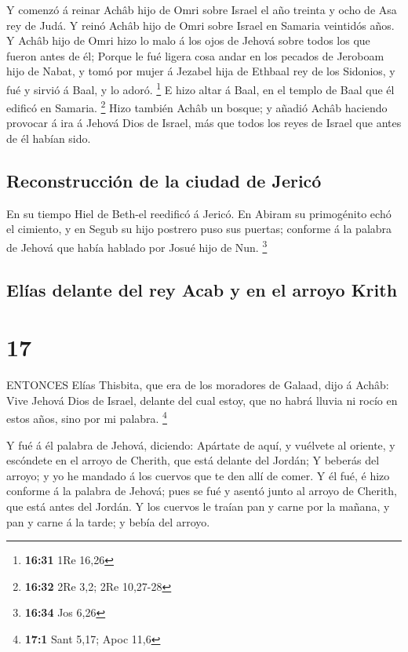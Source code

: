  Y comenzó á reinar Achâb hijo de Omri sobre Israel el año
treinta y ocho de Asa rey de Judá.  Y reinó Achâb hijo de
Omri sobre Israel en Samaria veintidós años. Y Achâb hijo de Omri hizo
lo malo á los ojos de Jehová sobre todos los que fueron antes de él;
 Porque le fué ligera cosa andar en los pecados de Jeroboam
hijo de Nabat, y tomó por mujer á Jezabel hija de Ethbaal rey de los
Sidonios, y fué y sirvió á Baal, y lo adoró. \footnote{\textbf{16:31}
  1Re 16,26}  E hizo altar á Baal, en el templo de Baal que
él edificó en Samaria. \footnote{\textbf{16:32} 2Re 3,2; 2Re 10,27-28}
 Hizo también Achâb un bosque; y añadió Achâb haciendo
provocar á ira á Jehová Dios de Israel, más que todos los reyes de
Israel que antes de él habían sido.

\hypertarget{reconstrucciuxf3n-de-la-ciudad-de-jericuxf3}{%
\subsection{Reconstrucción de la ciudad de
Jericó}\label{reconstrucciuxf3n-de-la-ciudad-de-jericuxf3}}

 En su tiempo Hiel de Beth-el reedificó á Jericó. En Abiram
su primogénito echó el cimiento, y en Segub su hijo postrero puso sus
puertas; conforme á la palabra de Jehová que había hablado por Josué
hijo de Nun. \footnote{\textbf{16:34} Jos 6,26}

\hypertarget{eluxedas-delante-del-rey-acab-y-en-el-arroyo-krith}{%
\subsection{Elías delante del rey Acab y en el arroyo
Krith}\label{eluxedas-delante-del-rey-acab-y-en-el-arroyo-krith}}

\hypertarget{section-16}{%
\section{17}\label{section-16}}

 ENTONCES Elías Thisbita, que era de los moradores de
Galaad, dijo á Achâb: Vive Jehová Dios de Israel, delante del cual
estoy, que no habrá lluvia ni rocío en estos años, sino por mi palabra.
\footnote{\textbf{17:1} Sant 5,17; Apoc 11,6}

 Y fué á él palabra de Jehová, diciendo: 
Apártate de aquí, y vuélvete al oriente, y escóndete en el arroyo de
Cherith, que está delante del Jordán;  Y beberás del arroyo;
y yo he mandado á los cuervos que te den allí de comer.  Y
él fué, é hizo conforme á la palabra de Jehová; pues se fué y asentó
junto al arroyo de Cherith, que está antes del Jordán.  Y
los cuervos le traían pan y carne por la mañana, y pan y carne á la
tarde; y bebía del arroyo.

